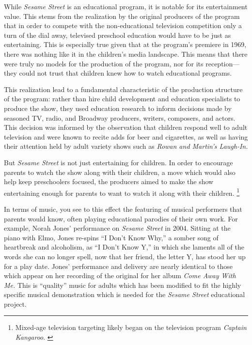 \documentclass[12pt,letterpaper]{article}
\newcommand{\ses}{\textit{Sesame Street }}
\begin{document}
	While \textit{Sesame Street} is an educational program, it is notable 
	for its entertainment value. This stems from the realization by the 
	original producers of the program that in order to compete with the 
	non-educational television competition only a turn of the dial away,
	televised preschool education would have to be just as 
	entertaining.\autocite[38]{Cooney} This is especially true given that
	at the program's premiere in 1969, there was nothing like it in the 
	children's media landscape.\autocite[See chapter 3 for a survey of the 
	contemporary children's television landscape]{Davis} This means that 
	there were truly no models for the production of the program, nor for 
	its
	reception---they could not trust that children knew how to watch
	educational programs.  

	This realization lead to a fundamental characteristic of the production
	structure of the program: rather than hire child development and 
	education specialists to produce the show, they used education research
	to inform decisions made by seasoned TV, radio, and Broadway producers,
	writers, composers, and actors. This decision was informed by the 
	observation
	that children respond well to adult television and were known to recite
	adds for beer and cigarettes, as well as having their attention held by
	adult variety shows such as \textit{Rowan and Martin's Laugh-In.}
	\autocite[16]{Ostrofsky2012}

	But \textit{Sesame Street} is not just entertaining for children. 
	In order to encourage parents to watch the show along with their
	children, a move which would also help keep preschoolers focused,
	the producers aimed to make the show entertaining enough for parents
	to want to watch it along with their children.
	\autocite[294]{Ostrofsky2017}
	\footnote{Mixed-age television targeting likely began on the 
	television program \textit{Captain Kangaroo}. \autocite[46]{Davis}} 
	
	In terms of music, you see to this effect the featuring of musical 
	performers that parents would know, often playing educational parodies 
	of their own work. For example, Norah Jones' performance on \ses in 
	2004.\autocite{4081} Sitting at the piano with Elmo, Jones 
	re-spins ``I Don't Know Why,'' a somber song of heartbreak and 
	alcoholism, as ``I Don't Know Y,'' in which she laments all of the 
	words she can no longer spell, now that her friend, the letter Y, has 
	stood her up for a play date. Jones' performance and delivery are nearly
	identical to those which appear on her recording of the original for her
	album \textit{Come Away With Me.} This is ``quality'' music for adults
	which has been modified to fit the highly specific musical demonstration
	which is needed for the \ses educational project.
		
\end{document}
